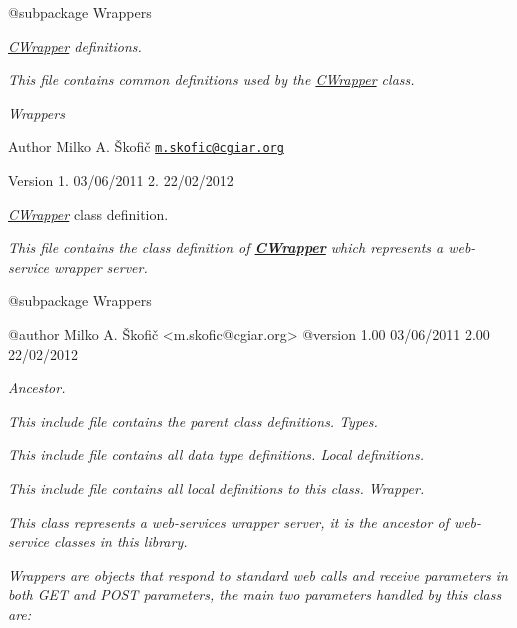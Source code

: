 {\itshape \begin{DoxyVerb} @subpackage        Wrappers\end{DoxyVerb}
}

{\itshape \hyperlink{class_c_wrapper}{C\-Wrapper} definitions.}

{\itshape This file contains common definitions used by the \hyperlink{class_c_wrapper}{C\-Wrapper} class.}

{\itshape  Wrappers}

{\itshape \begin{DoxyAuthor}{Author}
Milko A. Škofič \href{mailto:m.skofic@cgiar.org}{\tt m.\-skofic@cgiar.\-org} 
\end{DoxyAuthor}
\begin{DoxyVersion}{Version}
1. 03/06/2011 2. 22/02/2012
\end{DoxyVersion}
{\itshape \hyperlink{class_c_wrapper}{C\-Wrapper}} class definition.}

{\itshape This file contains the class definition of {\bfseries \hyperlink{class_c_wrapper}{C\-Wrapper}} which represents a web-\/service wrapper server.}

{\itshape \begin{DoxyVerb} @subpackage        Wrappers

 @author            Milko A. Škofič <m.skofic@cgiar.org>
 @version   1.00 03/06/2011
                    2.00 22/02/2012\end{DoxyVerb}
}

{\itshape Ancestor.}

{\itshape This include file contains the parent class definitions. Types.}

{\itshape This include file contains all data type definitions. Local definitions.}

{\itshape This include file contains all local definitions to this class. Wrapper.}

{\itshape This class represents a web-\/services wrapper server, it is the ancestor of web-\/service classes in this library.}

{\itshape Wrappers are objects that respond to standard web calls and receive parameters in both {\itshape G\-E\-T} and {\itshape P\-O\-S\-T} parameters, the main two parameters handled by this class are\-:}

